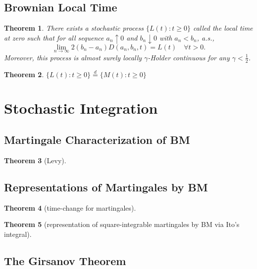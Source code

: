 \documentclass{article}
\newtheorem{Thm}{Theorem}[section]
\theoremstyle{definition}
\renewcommand{\geq}{\geqslant}
\newcommand{\<}{\left\langle}
\renewcommand{\>}{\right\rangle}
\begin{document}
\subsection{Brownian Local Time}

\begin{Thm}
    There exists a stochastic process $\{L(t):t\geq 0\}$ called the local time at zero such that for all sequence $a_n\uparrow 0$ and $b_n\downarrow 0$ with 
    $a_n<b_n$, a.s.,
    \[\lim_{n\to\infty} 2(b_n-a_n)D(a_n,b_n,t)=L(t) \quad\forall t>0.\]
    Moreover, this process is almost surely locally $\gamma$-Holder continuous for any $\gamma<\frac{1}{2}$.
\end{Thm}

\begin{Thm}
    $\{L(t):t\geq 0\}\overset{d}{=}  \{M(t):t\geq 0\}$
\end{Thm}


\section{Stochastic Integration}
\subsection{}


\subsection{Martingale Characterization of BM}
\begin{Thm}[Levy]
    
\end{Thm}

\subsection{Representations of Martingales by BM}


\begin{Thm}[time-change for martingales]
    
\end{Thm}


\begin{Thm}[representation of square-integrable martingales by BM via Ito's integral]
    
\end{Thm}

\subsection{The Girsanov Theorem}
\end{document}
